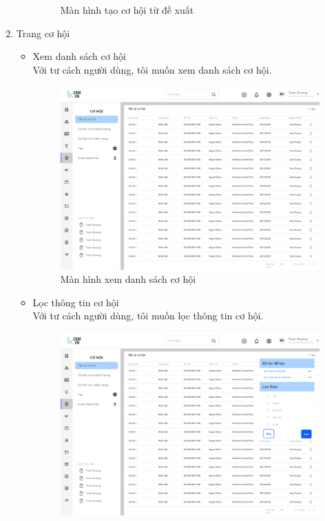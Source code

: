 \documentclass[12pt,a4paper]{article}
\begin{document}
\begin{enumerate}
\begin{itemize}
\begin{figure}[H]
                \vspace{0.5cm}
                \caption{Màn hình tạo cơ hội từ đề xuất}
                \label{taocohoitudx}
            \end{figure}
        \end{itemize}
        \item Trang cơ hội
        \begin{itemize}
            \item Xem danh sách cơ hội
            \\Với tư cách người dùng, tôi muốn xem danh sách cơ hội.
            \begin{figure}[H]
                \centering \includegraphics[width=\textwidth]{Img/Nguyet/Cohoi/dscohoi.png}
                \vspace{0.5cm}
                \caption{Màn hình xem danh sách cơ hội }
                \label{dscohoi}
            \end{figure}
            \item Lọc thông tin cơ hội
            \\Với tư cách người dùng, tôi muốn lọc thông tin cơ hội.
            \begin{figure}[H]
                \centering \includegraphics[width=\textwidth]{Img/Nguyet/Cohoi/loccohoi.png}

\end{figure}
\end{itemize}
\end{enumerate}
\end{document}
